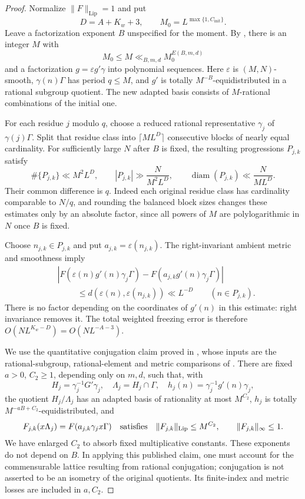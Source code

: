 \documentclass[11pt]{article}
\theoremstyle{definition}
\theoremstyle{remark}
\begin{document}
\begin{proof}
Normalize $\|F\|_{\mathrm{Lip}}=1$ and put
\[
 D=A+K_w+3,\qquad M_0=L^{\max\{1,C_{\mathrm{init}}\}}.
\]
Leave a factorization exponent $B$ unspecified for the moment. By
\cite[Theorem 1.19]{GTOrbits2012}, there is an integer $M$ with
\[
 M_0\leq M\ll_{B,m,d}M_0^{E(B,m,d)}
\]
and a factorization $g=\varepsilon g'\gamma$ into polynomial sequences.
Here $\varepsilon$ is $(M,N)$-smooth, $\gamma(n)\Gamma$ has period
$q\leq M$, and $g'$ is totally $M^{-B}$-equidistributed in a rational
subgroup quotient. The new adapted basis consists of $M$-rational
combinations of the initial one.

For each residue $j$ modulo $q$, choose a reduced rational representative
$\gamma_j$ of $\gamma(j)\Gamma$. Split that residue class into
$\lceil ML^D\rceil$ consecutive blocks of nearly equal cardinality.
For sufficiently large $N$ after $B$ is fixed, the resulting progressions
$P_{j,k}$ satisfy
\begin{equation}\label{eq:gf-cells}
 \#\{P_{j,k}\}\ll M^2L^D,\qquad
 |P_{j,k}|\gg\frac{N}{M^2L^D},\qquad
 \operatorname{diam}(P_{j,k})\ll\frac{N}{ML^D}.
\end{equation}
Their common difference is $q$. Indeed each original residue class has
cardinality comparable to $N/q$, and rounding the balanced block sizes
changes these estimates only by an absolute factor, since all powers of
$M$ are polylogarithmic in $N$ once $B$ is fixed.

Choose $n_{j,k}\in P_{j,k}$ and put $a_{j,k}=\varepsilon(n_{j,k})$.
The right-invariant ambient metric and smoothness imply
\begin{align*}
 &|F(\varepsilon(n)g'(n)\gamma_j\Gamma)
       -F(a_{j,k}g'(n)\gamma_j\Gamma)|\\
 &\hspace{1cm}\leq d(\varepsilon(n),\varepsilon(n_{j,k}))
       \ll L^{-D}\qquad(n\in P_{j,k}).
\end{align*}
There is no factor depending on the coordinates of $g'(n)$ in this
estimate: right invariance removes it. The total weighted freezing
error is therefore $O(NL^{K_w-D})=O(NL^{-A-3})$.

We use the quantitative conjugation claim proved in
\cite[p.~547]{moebius}, whose inputs are the rational-subgroup,
rational-element and metric comparisons of
\cite[Appendix A]{GTOrbits2012}. There are fixed $a>0$, $C_2\geq1$,
depending only on $m,d$, such that, with
\[
 H_j=\gamma_j^{-1}G'\gamma_j,\quad
 \Lambda_j=H_j\cap\Gamma,\quad
 h_j(n)=\gamma_j^{-1}g'(n)\gamma_j,
\]
the quotient $H_j/\Lambda_j$ has an adapted basis of rationality at most
$M^{C_2}$, $h_j$ is totally $M^{-aB+C_2}$-equidistributed, and
\[
 F_{j,k}(x\Lambda_j)=F(a_{j,k}\gamma_jx\Gamma)
 \quad\hbox{satisfies}\quad
 \|F_{j,k}\|_{\mathrm{Lip}}\leq M^{C_2},\qquad
 \|F_{j,k}\|_\infty\leq1.
\]
We have enlarged $C_2$ to absorb fixed multiplicative constants. These
exponents do not depend on $B$. In applying this published claim, one
must account for the commensurable lattice resulting from rational
conjugation; conjugation is not asserted to be an isometry of the
original quotients. Its finite-index and metric losses are included in
$a,C_2$.


\end{proof}
\end{document}
